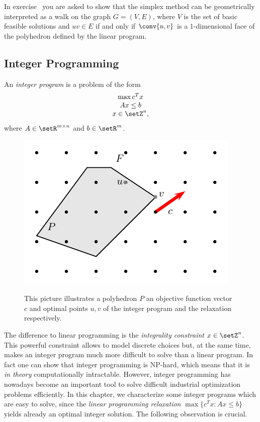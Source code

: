 In exercise~\label{item:18} you are asked to show that the simplex
method can be geometrically interpreted as a walk on the graph $G =
(V,E)$, where $V$ is the set of basic feasible solutions and $uv\in  E$
if and only if $\conv\{u,v\}$ is a $1$-dimensional face of the
polyhedron defined by the linear program. 



\subsection{Integer Programming}
\label{sec:integer-programming}

An \emph{integer program} is a problem of the form 
\begin{displaymath}
  \begin{array}{c}
    \max c^Tx \\
    Ax\leq b \\
    x \in \setZ^n,
  \end{array}
\end{displaymath}
where $A \in \setR^{m\times n}$ and $b \in \setR^m$. 




\begin{figure}[htbp]
  \begin{center}
   \includegraphics{figures/PicPolyhedra2.pdf}
\label{fig:inthull}
  \end{center}
  \caption{This picture illustrates a polyhedron $P$ an objective
    function vector $c$ and optimal points $u,v$ of the integer
    program and the relaxation respectively. }
\end{figure}



The difference to linear
programming is the \emph{integrality constraint} $x \in \setZ^n$. This
powerful constraint  allows to model discrete choices but, at the same
time, makes an integer program much more difficult to solve than a
linear program. In fact one can show that integer programming is
NP-hard, which means that it is \emph{in theory} computationally
intractable. However, integer programming has nowadays become an
important tool to solve difficult industrial optimization problems
efficiently. In this chapter, we characterize some integer programs
which are easy to solve, since the \emph{linear programming
  relaxation} $\max\{c^Tx \colon Ax\leq b\}$ yields already an optimal
integer solution. The following observation is crucial. 

